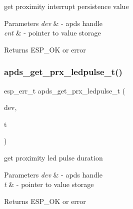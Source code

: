 \begin{DoxyItemize}
\item get proximity interrupt persistence value 
\end{DoxyItemize}


\begin{DoxyParams}{Parameters}
{\em dev} & -\/ apds handle \\
\hline
{\em cnt} & -\/ pointer to value storage \\
\hline
\end{DoxyParams}
\begin{DoxyReturn}{Returns}
E\+S\+P\+\_\+\+OK or error 
\end{DoxyReturn}
\mbox{\label{group__APDS9960__ProximityFunctions_gadfe27306164fc3570a5e0dd4a05381bd}} 
\subsubsection{\texorpdfstring{apds\+\_\+get\+\_\+prx\+\_\+ledpulse\+\_\+t()}{apds\_get\_prx\_ledpulse\_t()}}
{\footnotesize\ttfamily esp\+\_\+err\+\_\+t apds\+\_\+get\+\_\+prx\+\_\+ledpulse\+\_\+t (\begin{DoxyParamCaption}\item[{\hyperlink{structAPDS9960__Driver}{A\+P\+D\+S\+\_\+\+D\+EV}}]{dev,  }\item[{prx\+\_\+ledtime\+\_\+t $\ast$}]{t }\end{DoxyParamCaption})}




\begin{DoxyItemize}
\item get proximity led pulse duration 
\end{DoxyItemize}


\begin{DoxyParams}{Parameters}
{\em dev} & -\/ apds handle \\
\hline
{\em t} & -\/ pointer to value storage \\
\hline
\end{DoxyParams}
\begin{DoxyReturn}{Returns}
E\+S\+P\+\_\+\+OK or error 
\end{DoxyReturn}
\mbox{\label{group__APDS9960__ProximityFunctions_gab3badaf46315c85ec711221e11fca63a}} 
